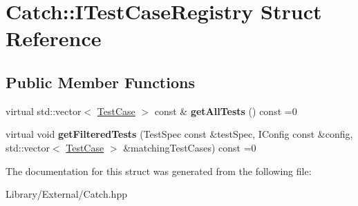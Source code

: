 \hypertarget{struct_catch_1_1_i_test_case_registry}{}\section{Catch\+:\+:I\+Test\+Case\+Registry Struct Reference}
\label{struct_catch_1_1_i_test_case_registry}
\subsection*{Public Member Functions}
\begin{DoxyCompactItemize}
\item 
\hypertarget{struct_catch_1_1_i_test_case_registry_ad6e4d4a621655123f73ae98cfeda063d}{}virtual std\+::vector$<$ \hyperlink{class_catch_1_1_test_case}{Test\+Case} $>$ const \& {\bfseries get\+All\+Tests} () const =0\label{struct_catch_1_1_i_test_case_registry_ad6e4d4a621655123f73ae98cfeda063d}

\item 
\hypertarget{struct_catch_1_1_i_test_case_registry_a625038a4f698f057503782016cbd0664}{}virtual void {\bfseries get\+Filtered\+Tests} (Test\+Spec const \&test\+Spec, I\+Config const \&config, std\+::vector$<$ \hyperlink{class_catch_1_1_test_case}{Test\+Case} $>$ \&matching\+Test\+Cases) const =0\label{struct_catch_1_1_i_test_case_registry_a625038a4f698f057503782016cbd0664}

\end{DoxyCompactItemize}


The documentation for this struct was generated from the following file\+:\begin{DoxyCompactItemize}
\item 
Library/\+External/Catch.\+hpp\end{DoxyCompactItemize}

